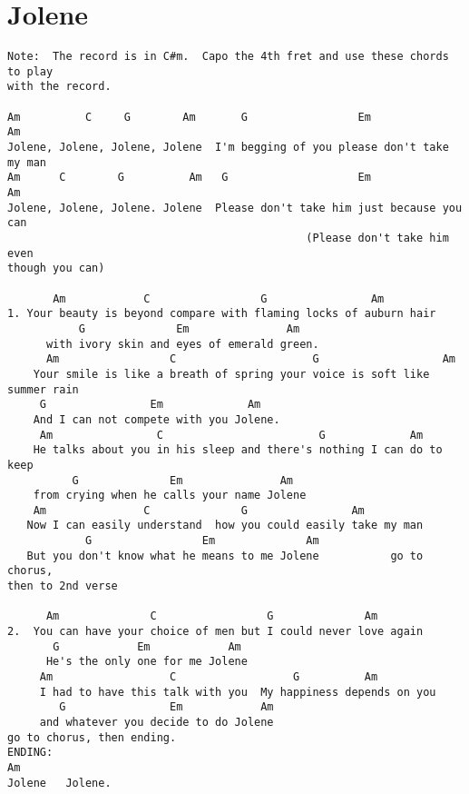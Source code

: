\documentclass[leqno]{memoir}
\begin{document}
\chapter{Jolene}
\begin{verbatim}
Note:  The record is in C#m.  Capo the 4th fret and use these chords to play
with the record.   
                                        
Am          C     G        Am       G                 Em                Am
Jolene, Jolene, Jolene, Jolene  I'm begging of you please don't take my man
Am      C        G          Am   G                    Em               Am
Jolene, Jolene, Jolene. Jolene  Please don't take him just because you can
                                              (Please don't take him even
though you can) 

       Am            C                 G                Am
1. Your beauty is beyond compare with flaming locks of auburn hair
           G              Em               Am
      with ivory skin and eyes of emerald green.
      Am                 C                     G                   Am
    Your smile is like a breath of spring your voice is soft like summer rain
     G                Em             Am
    And I can not compete with you Jolene.
     Am                C                        G             Am
    He talks about you in his sleep and there's nothing I can do to keep
          G              Em               Am
    from crying when he calls your name Jolene
    Am               C              G                Am
   Now I can easily understand  how you could easily take my man 
            G                 Em              Am
   But you don't know what he means to me Jolene           go to chorus,
then to 2nd verse

      Am              C                 G              Am
2.  You can have your choice of men but I could never love again 
       G            Em            Am
      He's the only one for me Jolene  
     Am                  C                  G          Am
     I had to have this talk with you  My happiness depends on you
        G                Em            Am
     and whatever you decide to do Jolene
go to chorus, then ending.
ENDING:
Am
Jolene   Jolene.
\end{verbatim}
\newpage
\end{document}
